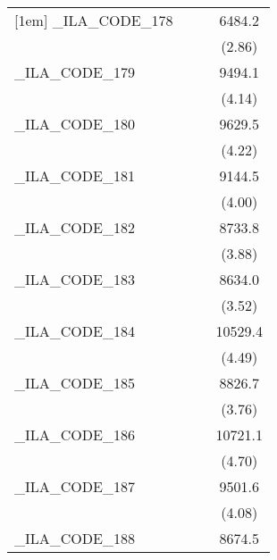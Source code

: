{\begin{tabular}{l*{3}{c}}
[1em]
\_ILA\_CODE\_178&                     &                     &      6484.2\sym{**} \\
            &                     &                     &      (2.86)         \\
[1em]
\_ILA\_CODE\_179&                     &                     &      9494.1\sym{***}\\
            &                     &                     &      (4.14)         \\
[1em]
\_ILA\_CODE\_180&                     &                     &      9629.5\sym{***}\\
            &                     &                     &      (4.22)         \\
[1em]
\_ILA\_CODE\_181&                     &                     &      9144.5\sym{***}\\
            &                     &                     &      (4.00)         \\
[1em]
\_ILA\_CODE\_182&                     &                     &      8733.8\sym{***}\\
            &                     &                     &      (3.88)         \\
[1em]
\_ILA\_CODE\_183&                     &                     &      8634.0\sym{***}\\
            &                     &                     &      (3.52)         \\
[1em]
\_ILA\_CODE\_184&                     &                     &     10529.4\sym{***}\\
            &                     &                     &      (4.49)         \\
[1em]
\_ILA\_CODE\_185&                     &                     &      8826.7\sym{***}\\
            &                     &                     &      (3.76)         \\
[1em]
\_ILA\_CODE\_186&                     &                     &     10721.1\sym{***}\\
            &                     &                     &      (4.70)         \\
[1em]
\_ILA\_CODE\_187&                     &                     &      9501.6\sym{***}\\
            &                     &                     &      (4.08)         \\
[1em]
\_ILA\_CODE\_188&                     &                     &      8674.5\sym{***}\\

\end{tabular}}

